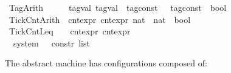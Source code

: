 \begin{isabellebody}
%
\isanewline
{\isacharbar}\ TagArith\ \ \ \ \ \ {\isacartoucheopen}tag{\isacharunderscore}val{\isacartoucheclose}\ {\isacartoucheopen}tag{\isacharunderscore}val{\isacartoucheclose}\ {\isacartoucheopen}{\isacharparenleft}{\isacharprime}{\isasymtau}\ tag{\isacharunderscore}const\ {\isasymtimes}\ {\isacharprime}{\isasymtau}\ tag{\isacharunderscore}const{\isacharparenright}\ {\isasymRightarrow}\ bool{\isacartoucheclose}\ {\isacharparenleft}{\isacartoucheopen}{\isasymlfloor}{\isacharunderscore}{\isacharcomma}\ {\isacharunderscore}{\isasymrfloor}\ {\isasymin}\ {\isacharunderscore}{\isacartoucheclose}{\isacharparenright}\isanewline
%
\isanewline
{\isacharbar}\ TickCntArith\ \ {\isacartoucheopen}cnt{\isacharunderscore}expr{\isacartoucheclose}\ {\isacartoucheopen}cnt{\isacharunderscore}expr{\isacartoucheclose}\ {\isacartoucheopen}{\isacharparenleft}nat\ {\isasymtimes}\ nat{\isacharparenright}\ {\isasymRightarrow}\ bool{\isacartoucheclose}\ \ \ \ \ \ {\isacharparenleft}{\isacartoucheopen}{\isasymlceil}{\isacharunderscore}{\isacharcomma}\ {\isacharunderscore}{\isasymrceil}\ {\isasymin}\ {\isacharunderscore}{\isacartoucheclose}{\isacharparenright}\isanewline
%
\isanewline
{\isacharbar}\ TickCntLeq\ \ \ \ {\isacartoucheopen}cnt{\isacharunderscore}expr{\isacartoucheclose}\ {\isacartoucheopen}cnt{\isacharunderscore}expr{\isacartoucheclose}\ \ \ \ \ \ \ \ \ \ \ \ \ \ \ \ \ \ \ \ \ \ \ \ \ \ \ \ {\isacharparenleft}{\isacartoucheopen}{\isacharunderscore}\ {\isasympreceq}\ {\isacharunderscore}{\isacartoucheclose}{\isacharparenright}\isanewline
\isanewline
{}\isamarkupfalse%
\ {\isacharprime}{\isasymtau}\ system\ {\isacharequal}\ {\isacartoucheopen}{\isacharprime}{\isasymtau}\ constr\ list{\isacartoucheclose}%
\begin{isamarkuptext}%
The abstract machine has configurations composed of:


\end{isamarkuptext}
\end{isabellebody}
